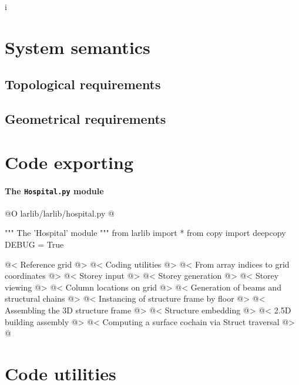 i\documentclass[11pt,oneside]{article}    %
\begin{document}
\section{System semantics}

\subsection{Topological requirements}

\subsection{Geometrical requirements}


\section{Code exporting}

\paragraph{The \texttt{Hospital.py} module}
@O larlib/larlib/hospital.py
@{""" The 'Hospital' module """
from larlib import *
from copy import deepcopy
DEBUG = True

@< Reference grid @>
@< Coding utilities @>
@< From array indices to grid coordinates @>
@< Storey input @>
@< Storey generation @>
@< Storey viewing @>
@< Column locations on grid @>
@< Generation of beams and structural chains @>
@< Instancing of structure frame by floor @>
@< Assembling the 3D structure frame @>
@< Structure embedding @>
@< 2.5D building assembly @>
@< Computing a surface cochain via Struct traversal @>
@}


\appendix
\section{Code utilities}
\end{document}
